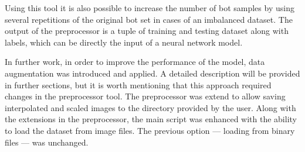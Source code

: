 Using this tool it is also possible to increase the number of bot samples by using several repetitions of the original bot set in cases of an imbalanced dataset.
The output of the preprocessor is a tuple of training and testing dataset along with labels, which can be directly the input of a neural network model.

In further work, in order to improve the performance of the model, data augmentation was introduced and applied.
A detailed description will be provided in further sections, but it is worth mentioning that this approach required changes in the preprocessor tool.
The preprocessor was extend to allow saving interpolated and scaled images to the directory provided by the user.
Along with the extensions in the preprocessor, the main script was enhanced with the ability to load the dataset from image files.
The previous option --- loading from binary files --- was unchanged.